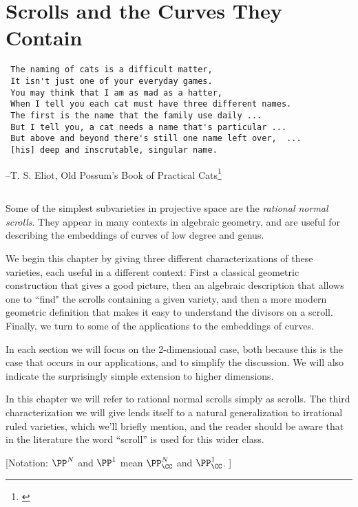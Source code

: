 

\chapter{Scrolls and the Curves They Contain}
\label{ScrollsChapter}


\begin{verbatim}
 The naming of cats is a difficult matter,
 It isn't just one of your everyday games.
 You may think that I am as mad as a hatter,
 When I tell you each cat must have three different names.
 The first is the name that the family use daily ...
 But I tell you, a cat needs a name that's particular ...
 But above and beyond there's still one name left over,  ...
 [his] deep and inscrutable, singular name.
\end{verbatim}
--T. S. Eliot, Old Possum's Book of Practical Cats\footnote{\cite{PracticalCats}}

\section*{}
Some of the simplest subvarieties in projective space are the \emph{rational normal scrolls}. They appear in many contexts in algebraic geometry, and are useful for describing the embeddings of curves of low degree and genus. 

We begin this chapter by giving three different characterizations of these varieties, each useful in a different context: First a classical geometric construction that gives a good picture, then an algebraic description that allows one to ``find" the scrolls containing a given variety, and then a more modern geometric definition that makes it easy to understand the divisors on a scroll. Finally, we turn to some of the applications to the embeddings of curves.

In each section we will focus on the 2-dimensional case, both because this is the case that occurs in our applications, and to simplify the discussion. We will also indicate the surprisingly simple extension to higher dimensions.

In this chapter we will refer to rational normal scrolls simply as scrolls. The third characterization we will give lends itself to a natural generalization to  irrational ruled varieties, which we'll briefly mention, and the reader should be aware that in the literature the word ``scroll'' is used for this wider class.

[Notation:  $\PP^{N}$ and $\PP^{1}$ mean $\PP_{\CC}^{N}$ and $\PP_{\CC}^{1}$. ]

